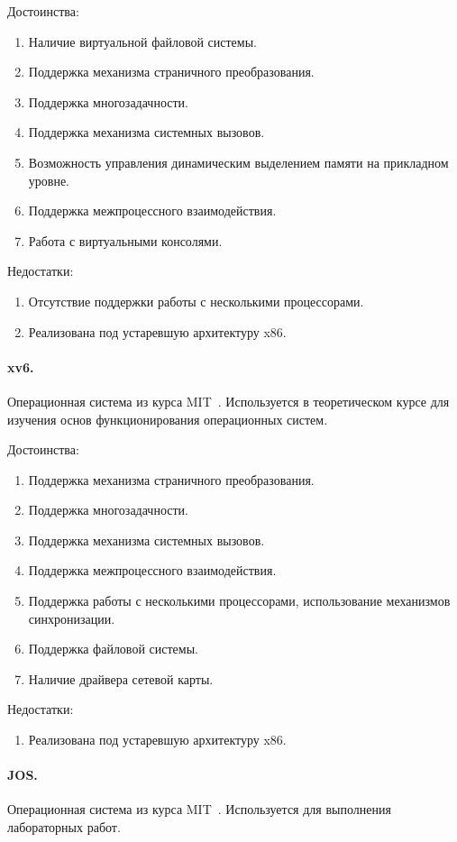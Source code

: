 Достоинства:
\begin{enumerate}[1.]
\item Наличие виртуальной файловой системы.
\item Поддержка механизма страничного преобразования.
\item Поддержка многозадачности.
\item Поддержка механизма системных вызовов.
\item Возможность управления динамическим выделением памяти на прикладном уровне.
\item Поддержка межпроцессного взаимодействия.
\item Работа с виртуальными консолями.
\end{enumerate}

Недостатки:
\begin{enumerate}[1.]
\item Отсутствие поддержки работы с несколькими процессорами.
\item Реализована под устаревшую архитектуру x86.
\end{enumerate}


\paragraph{xv6.} Операционная система из курса MIT~\cite{mit_xv6}. Используется в теоретическом
курсе для изучения основ функционирования операционных систем.

Достоинства:
\begin{enumerate}[1.]
\item Поддержка механизма страничного преобразования.
\item Поддержка многозадачности.
\item Поддержка механизма системных вызовов.
\item Поддержка межпроцессного взаимодействия.
\item Поддержка работы с несколькими процессорами, использование механизмов синхронизации.
\item Поддержка файловой системы.
\item Наличие драйвера сетевой карты.
\end{enumerate}

Недостатки:
\begin{enumerate}[1.]
\item Реализована под устаревшую архитектуру x86.
\end{enumerate}


\paragraph{JOS.} Операционная система из курса MIT~\cite{mit_os_dev}. Используется для
выполнения лабораторных работ.

